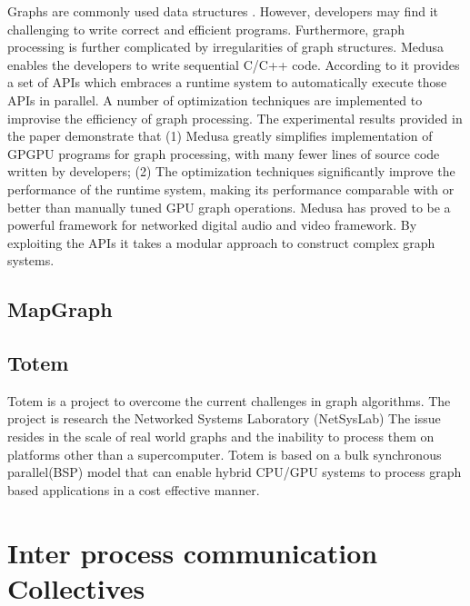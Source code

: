      Graphs are commonly used data structures . However, developers
     may find it challenging to write correct and efficient
     programs. Furthermore, graph processing is further complicated by
     irregularities of graph structures. Medusa enables the developers
     to write sequential C/C++ code. According to \cite{paper_medusa}
     it provides a set of APIs which embraces a runtime system to
     automatically execute those APIs in parallel. A number of
     optimization techniques are implemented to improvise the
     efficiency of graph processing. The experimental results provided
     in the paper \cite{paper_medusa} demonstrate that (1) Medusa
     greatly simplifies implementation of GPGPU programs for graph
     processing, with many fewer lines of source code written by
     developers; (2) The optimization techniques significantly improve
     the performance of the runtime system, making its performance
     comparable with or better than manually tuned GPU graph
     operations. \cite{www-medusa} Medusa has proved to be a powerful
     framework for networked digital audio and video
     framework. \cite{www-medusa} By exploiting the APIs it takes a
     modular approach to construct complex graph systems. 

\subsection{ MapGraph}
\subsection{ Totem}

     Totem is a project to overcome the current challenges in graph 
     algorithms.  The project is research the Networked Systems
     Laboratory (NetSysLab) The issue resides in the scale of real 
     world graphs and the inability to process them on platforms
     other than a supercomputer.  Totem is based on a bulk synchronous 
     parallel(BSP) model that can enable hybrid CPU/GPU systems to process 
     graph based applications in a cost effective manner. 
     \cite{www-netsyslab}


\section{Inter process communication Collectives}


